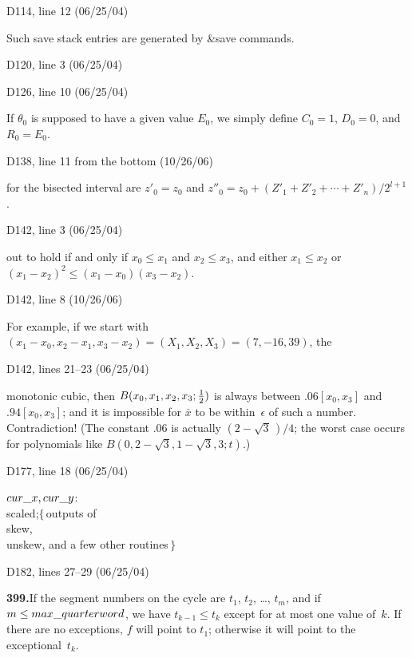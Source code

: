 {{\bugonpage D114, line 12 (06/25/04)

\noindent
\qquad Such save stack entries are generated by \&{save} commands.

\bugonpage D120, line 3 (06/25/04)

\ninepoint{}

\bugonpage D126, line 10 (06/25/04)

\tenpoint\noindent
If $\theta_0$ is supposed to have a given value $E_0$, we simply
define $C_0=1$, $D_0=0$, and $R_0=E_0$.\cutpar

\bugonpage D138, line 11 from the bottom (10/26/06)

\tenpoint\noindent
for the bisected interval are $z'_0=z_0$
and $z''_0=z_0+(Z'_1+Z'_2+\cdots+Z'_n)/2^{l+1}$.

\bugonpage D142, line 3 (06/25/04)

\tenpoint\noindent
out to hold if and only if $x_0\le x_1$ and $x_2\le x_3$, and either
$x_1\le x_2$ or $(x_1-x_2)^2\le(x_1-x_0)(x_3-x_2)$.\cutpar

\bugonpage D142, line 8 (10/26/06)

\tenpoint\noindent\quad
For example, if we start with $(x_1-x_0,x_2-x_1,x_3-x_2)=
(X_1,X_2,X_3)=(7,-16,39)$, the\cutpar

\bugonpage D142, lines 21--23 (06/25/04)

\tenpoint\noindent
monotonic
cubic, then $B(x_0,x_1,x_2,x_3;{1\over2})$ is always between
$.06[x_0,x_3]$ and $.94[x_0,x_3]$; and it is impossible for $\bar x$
to be within~$\epsilon$ of such a number. Contradiction!
(The constant .06 is actually $(2-\sqrt3\,)/4$; the worst case
occurs for polynomials like $B(0,2-\sqrt3,1-\sqrt3,3;t)$.)

\bugonpage D177, line 18 (06/25/04)

\ninepoint\noindent
$\\{cur\_x},\\{cur\_y}$: \\{scaled};\quad$\{\,$outputs of \\{skew},
 \\{unskew}, and a few other routines$\,\}$

\bugonpage D182, lines 27--29 (06/25/04)

\noindent
{\bf399.\quad}If
 the segment numbers on the cycle are $t_1$, $t_2$, \dots, $t_m$,
and if $m\le\\{max\_quarterword}$,
we have $t_{k-1}\le t_k$ except for at most one value of~$k$. If there are
no exceptions, $f$ will point to $t_1$; otherwise it will point to the
exceptional~$t_k$.

}}

